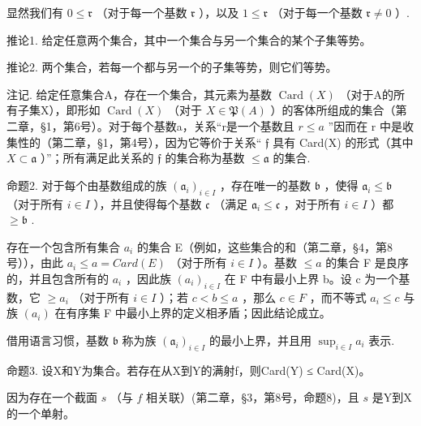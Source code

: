 显然我们有 \(0 \leqslant \mathfrak{r}\) （对于每一个基数 \(\mathfrak{r}\) ），以及 \(1 \leqslant \mathfrak{r}\) （对于每一个基数 \(\mathfrak{r} \neq 0\) ）.

推论1. 给定任意两个集合，其中一个集合与另一个集合的某个子集等势。

推论2. 两个集合，若每一个都与另一个的子集等势，则它们等势。

注记. 给定任意集合A，存在一个集合，其元素为基数 \(\operatorname{Card}(X)\) （对于A的所有子集X），即形如 \(\operatorname{Card}(X)\) （对于 \(X \in \mathfrak{P}(A)\) ）的客体所组成的集合（第二章，§1，第6号）。对于每个基数a，关系“r是一个基数且 \(r \leqslant a\) ”因而在 r 中是收集性的（第二章，§1，第4号），因为它等价于关系“ \(\mathfrak{f}\) 具有 Card(X) 的形式（其中 \(X \subset \mathfrak{a}\) ）”；所有满足此关系的 \(\mathfrak{f}\) 的集合称为基数 \(\leqslant \mathfrak{a}\) 的集合.

命题2. 对于每个由基数组成的族 \((\mathfrak{a}_i)_{i\in I}\) ，存在唯一的基数 \(\mathfrak{b}\) ，使得 \(\mathfrak{a}_i\leqslant \mathfrak{b}\) （对于所有 \(i\in I\) ），并且使得每个基数 \(\mathfrak{c}\) （满足 \(\mathfrak{a}_i\leqslant \mathfrak{c}\) ，对于所有 \(i\in I\) ）都 \(\geqslant \mathfrak{b}\) .

存在一个包含所有集合 \(a_{i}\) 的集合 E（例如，这些集合的和（第二章，§4，第8号）），由此 \(a_{i} \leqslant a = Card(E)\) （对于所有 \(i \in I\) ）。基数 \(\leqslant a\) 的集合 F 是良序的，并且包含所有的 \(a_{i}\) ，因此族 \((a_{i})_{i \in I}\) 在 F 中有最小上界 b。设 c 为一个基数，它 \(\geqslant a_{i}\) （对于所有 \(i \in I\) ）；若 \(c < b \leqslant a\) ，那么 \(c \in F\) ，而不等式 \(a_{i} \leqslant c\) 与族 \((a_{i})\) 在有序集 F 中最小上界的定义相矛盾；因此结论成立。

借用语言习惯，基数 \(\mathfrak{b}\) 称为族 \((\mathfrak{a}_i)_{i\in I}\) 的最小上界，并且用 \(\sup_{i\in I}a_i\) 表示.

命题3. 设X和Y为集合。若存在从X到Y的满射f，则Card(Y) ≤ Card(X)。

因为存在一个截面 \(s\) （与 \(f\) 相关联）(第二章，§3，第8号，命题8)，且 \(s\) 是Y到X的一个单射。

